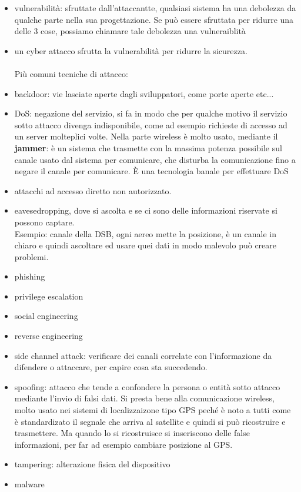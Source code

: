 \documentclass[oneside, 12pt]{extbook}
\begin{document}
\begin{itemize}
    \item vulnerabilità: sfruttate dall'attaccantte, qualsiasi sistema ha una debolezza da qualche parte nella sua progettazione. Se può essere sfruttata per ridurre una delle 3 cose, possiamo chiamare tale debolezza una vulneraiblità
    \item un cyber attacco sfrutta la vulnerabilità per ridurre la sicurezza.\\\\Più comuni tecniche di attacco:\\
    \item backdoor: vie lasciate aperte dagli sviluppatori, come porte aperte etc... 
    \item DoS: negazione del servizio, si fa in modo che per qualche motivo il servizio sotto attacco divenga indisponibile, come ad esempio richieste di accesso ad un server molteplici volte. Nella parte wireless è molto usato, mediante il \textbf{jammer}: è un sistema che trasmette con la massima potenza possibile sul canale usato dal sistema per comunicare, che disturba la comunicazione fino a negare il canale per comunicare. È una tecnologia banale per effettuare DoS 
    \item attacchi ad accesso diretto non autorizzato.
    \item eavesedropping, dove si ascolta e se ci sono delle informazioni riservate si possono captare.\\Esempio: canale della DSB, ogni aereo mette la posizione, è un canale in chiaro e quindi ascoltare ed usare quei dati in modo malevolo può creare problemi. 
    \item phishing
    \item privilege escalation
    \item social engineering
    \item reverse engineering
    \item side channel attack: verificare dei canali correlate con l'informazione da difendere o attaccare, per capire cosa sta succedendo. 
    \item spoofing: attacco che tende a confondere la persona o entità sotto attacco mediante l'invio di falsi dati. Si presta bene alla comunicazione wireless, molto usato nei sistemi di localizzaizone tipo GPS peché è noto a tutti come è standardizato il segnale che arriva al satellite e quindi si può ricostruire e trasmettere. Ma quando lo si ricostruisce si inseriscono delle false informazioni, per far ad esempio cambiare posizione al GPS.
    \item tampering: alterazione fisica del dispositivo
    \item malware
\end{itemize}
\end{document}
